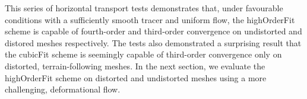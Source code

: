 This series of horizontal transport tests demonstrates that, under favourable conditions with a sufficiently smooth tracer and uniform flow, the highOrderFit scheme is capable of fourth-order and third-order convergence on undistorted and distored meshes respectively.
The tests also demonstrated a surprising result that the cubicFit scheme is seemingly capable of third-order convergence only on distorted, terrain-following meshes.
In the next section, we evaluate the highOrderFit scheme on distorted and undistorted meshes using a more challenging, deformational flow.

